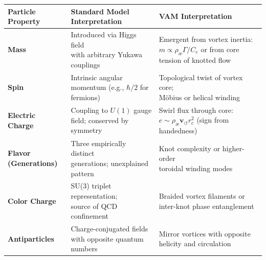 \documentclass[12pt]{article}
\begin{document}
\begin{table}[H]
    \centering
    \footnotesize
    \renewcommand{\arraystretch}{1.3}
    \begin{tabular}{|l|l|l|}
        \hline
        \textbf{Particle Property} & \textbf{Standard Model Interpretation} & \textbf{VAM Interpretation} \\
        \hline

        \textbf{Mass} &
        \makecell[l]{Introduced via Higgs field \\ with arbitrary Yukawa couplings} &
        \makecell[l]{Emergent from vortex inertia: \\ $m \propto \rho_\text{\ae} \Gamma / C_e$ \\ or from core tension of knotted flow} \\
        \hline

        \textbf{Spin} &
        \makecell[l]{Intrinsic angular momentum \\ (e.g., $\hbar/2$ for fermions)} &
        \makecell[l]{Topological twist of vortex core; \\ Möbius or helical winding} \\
        \hline

        \textbf{Electric Charge} &
        \makecell[l]{Coupling to $U(1)$ gauge field; \\ conserved by symmetry} &
        \makecell[l]{Swirl flux through core: \\ $e \sim \rho_\text{\ae} \mathbf{v}_{\scriptscriptstyle\boldsymbol{\circlearrowleft}} r_c^2$ \\ (sign from handedness)} \\
        \hline

        \textbf{Flavor (Generations)} &
        \makecell[l]{Three empirically distinct \\ generations; unexplained pattern} &
        \makecell[l]{Knot complexity or higher-order \\ toroidal winding modes} \\
        \hline

        \textbf{Color Charge} &
        \makecell[l]{SU(3) triplet representation; \\ source of QCD confinement} &
        \makecell[l]{Braided vortex filaments or \\ inter-knot phase entanglement} \\
        \hline

        \textbf{Antiparticles} &
        \makecell[l]{Charge-conjugated fields \\ with opposite quantum numbers} &
        \makecell[l]{Mirror vortices with opposite \\ helicity and circulation} \\
        \hline


\end{tabular}
\end{table}
\end{document}
